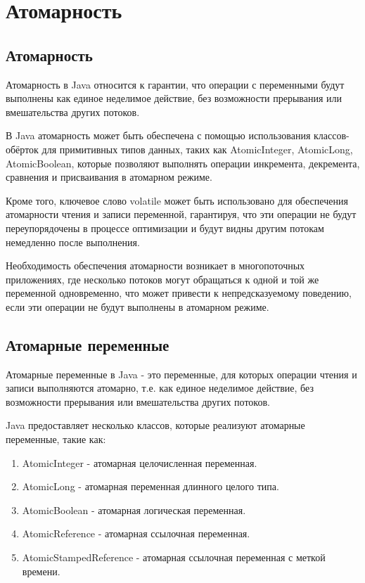 \newpage

\chapter{Атомарность}

\section{Атомарность}

Атомарность в Java относится к гарантии, что операции с переменными будут выполнены как единое неделимое действие, без возможности прерывания или вмешательства других потоков.

В Java атомарность может быть обеспечена с помощью использования классов-обёрток для примитивных типов данных, таких как AtomicInteger, AtomicLong, AtomicBoolean, которые позволяют выполнять операции инкремента, декремента, сравнения и присваивания в атомарном режиме.

Кроме того, ключевое слово volatile может быть использовано для обеспечения атомарности чтения и записи переменной, гарантируя, что эти операции не будут переупорядочены в процессе оптимизации и будут видны другим потокам немедленно после выполнения.

Необходимость обеспечения атомарности возникает в многопоточных приложениях, где несколько потоков могут обращаться к одной и той же переменной одновременно, что может привести к непредсказуемому поведению, если эти операции не будут выполнены в атомарном режиме.

\section{Атомарные переменные}

Атомарные переменные в Java - это переменные, для которых операции чтения и записи выполняются атомарно, т.е. как единое неделимое действие, без возможности прерывания или вмешательства других потоков.

Java предоставляет несколько классов, которые реализуют атомарные переменные, такие как:

\begin{enumerate}
    \item AtomicInteger - атомарная целочисленная переменная.
    \item AtomicLong - атомарная переменная длинного целого типа.
    \item AtomicBoolean - атомарная логическая переменная.
    \item AtomicReference - атомарная ссылочная переменная.
    \item AtomicStampedReference - атомарная ссылочная переменная с меткой времени.
\end{enumerate}

